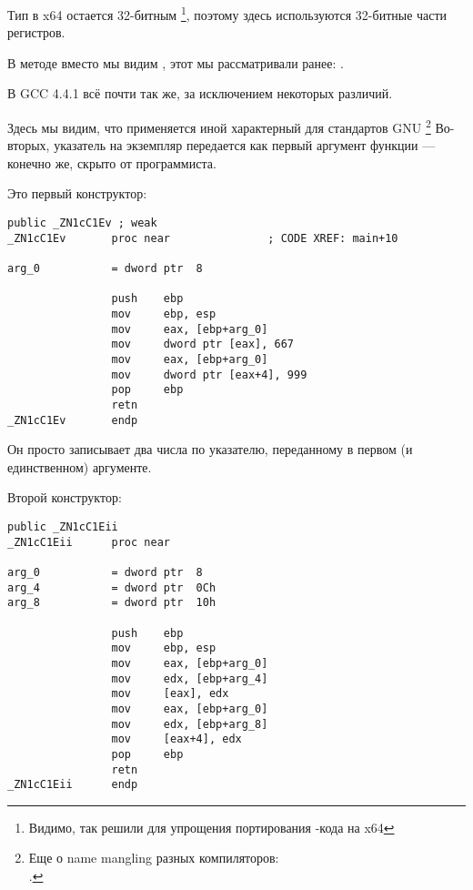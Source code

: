 

Тип \Tint в x64 остается 32-битным
\footnote{Видимо, так решили для упрощения портирования \CCpp{}-кода на x64}, 
поэтому здесь используются 32-битные части регистров.

В методе  вместо \RET мы видим , этот  мы рассматривали ранее: .


В GCC 4.4.1 всё почти так же, за исключением некоторых различий.



Здесь мы видим, что применяется иной  характерный для стандартов GNU
\footnote{Еще о name mangling разных компиляторов:\\
\InSqBrackets{\AgnerFogCC}.}
Во-вторых, указатель на экземпляр передается как первый аргумент функции --- конечно же, скрыто от программиста.

Это первый конструктор:

\begin{lstlisting}[style=customasm]
                public _ZN1cC1Ev ; weak
_ZN1cC1Ev       proc near               ; CODE XREF: main+10

arg_0           = dword ptr  8

                push    ebp
                mov     ebp, esp
                mov     eax, [ebp+arg_0]
                mov     dword ptr [eax], 667
                mov     eax, [ebp+arg_0]
                mov     dword ptr [eax+4], 999
                pop     ebp
                retn
_ZN1cC1Ev       endp
\end{lstlisting}

Он просто записывает два числа по указателю, переданному в первом (и единственном) аргументе.

Второй конструктор:

\begin{lstlisting}[style=customasm]
                public _ZN1cC1Eii
_ZN1cC1Eii      proc near

arg_0           = dword ptr  8
arg_4           = dword ptr  0Ch
arg_8           = dword ptr  10h

                push    ebp
                mov     ebp, esp
                mov     eax, [ebp+arg_0]
                mov     edx, [ebp+arg_4]
                mov     [eax], edx
                mov     eax, [ebp+arg_0]
                mov     edx, [ebp+arg_8]
                mov     [eax+4], edx
                pop     ebp
                retn
_ZN1cC1Eii      endp
\end{lstlisting}

